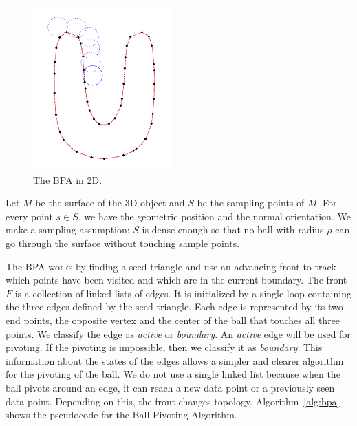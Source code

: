 \documentclass[12pt]{article}
\begin{document}
\begin{figure}[h]
  \centering
  \includegraphics[scale=0.5]{BPA.png}
  \caption{\label{bpa2D} The BPA in 2D.}
\end{figure}


Let $M$ be the surface of the 3D object and $S$ be the sampling points of $M$. For every point $s \in S$, we have the geometric position and the normal orientation. We make a sampling assumption: $S$ is dense enough so that no ball with radius $\rho$ can go through the surface without touching sample points.


The BPA works by finding a seed triangle and use an advancing front to track which points have been visited and which are in the current boundary. The front $F$ is a collection of linked lists of edges. It is initialized by a single loop containing the three edges defined by the seed triangle. Each edge is represented by its two end points, the opposite vertex and the center of the ball that touches all three points. We classify the edge as \textit{active} or \textit{boundary}. An \textit{active} edge will be used for pivoting. If the pivoting is impossible, then we classify it as \textit{boundary}. This information about the states of the edges allows a simpler and clearer algorithm for the pivoting of the ball. We do not use a single linked list because when the ball pivots around an edge, it can reach a new data point or a previously seen data point. Depending on this, the front changes topology. Algorithm~\ref{alg:bpa} shows the pseudocode for the Ball Pivoting Algorithm.
\end{document}
